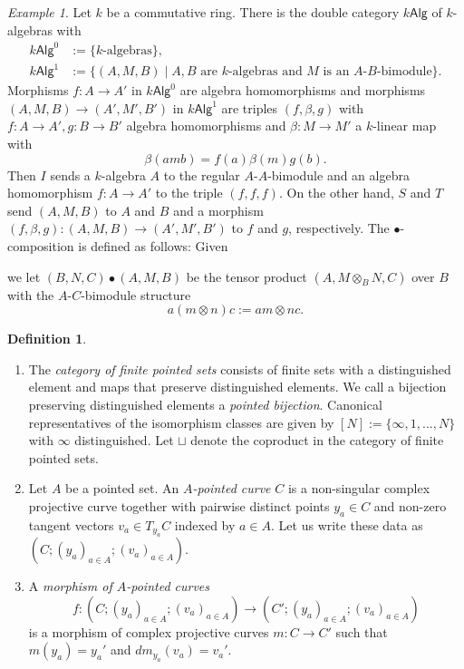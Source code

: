 \documentclass[11pt]{report}
\theoremstyle{definition}
\newtheorem{definition}[theorem]{Definition}
\theoremstyle{remark}
\theoremstyle{remark}
\newtheorem*{example}{Example}
\begin{document}
\begin{example}
Let $k$ be a commutative ring. There is the double category $k\mathsf{Alg}$ of $k$-algebras with
\begin{align*}
k\mathsf{Alg}^0 &:= \{ k\text{-algebras} \}, \\
k\mathsf{Alg}^1 &:= \{ (A,M,B) \mid A,B \text{ are } k\text{-algebras and } M \text{ is an } A\text{-}B\text{-bimodule} \}.
\end{align*}
Morphisms $f: A \to A'$ in $k\mathsf{Alg}^0$ are algebra homomorphisms and morphisms $(A,M,B) \to (A',M',B')$ in $k\mathsf{Alg}^1$ are triples $(f,\beta,g)$ with $f: A \to A', g: B \to B'$ algebra homomorphisms and $\beta: M \to M'$ a $k$-linear map with
\begin{equation*}
\beta(amb) = f(a) \beta(m) g(b).
\end{equation*}
Then $I$ sends a $k$-algebra $A$ to the regular $A$-$A$-bimodule and an algebra homomorphism $f: A \to A'$ to the triple $(f,f,f)$. On the other hand, $S$ and $T$ send $(A,M,B)$ to $A$ and $B$ and a morphism $(f,\beta,g): (A,M,B) \to (A',M',B')$ to $f$ and $g$, respectively. The $\bullet$-composition is defined as follows: Given
\begin{center}
\end{center}
we let $(B,N,C) \bullet (A,M,B)$ be the tensor product $(A,M \otimes_B N,C)$ over $B$ with the $A$-$C$-bimodule structure
\begin{equation*}
a(m \otimes n)c := am \otimes nc.
\end{equation*}
\end{example}

\begin{definition}
\begin{enumerate}[label=(\roman*)]
\item The \emph{category of finite pointed sets} consists of finite sets with a distinguished element and maps that preserve distinguished elements. We call a bijection preserving distinguished elements a \emph{pointed bijection}. Canonical representatives of the isomorphism classes are given by $[N] := \{ \infty,1,...,N \}$ with $\infty$ distinguished. Let $\sqcup$ denote the coproduct in the category of finite pointed sets.
\item Let $A$ be a pointed set. An \emph{$A$-pointed curve} $C$ is a non-singular complex projective curve together with pairwise distinct points $y_a \in C$ and non-zero tangent vectors $v_a \in T_{y_a} C$ indexed by $a \in A$. Let us write these data as $(C;(y_a)_{a \in A};(v_a)_{a \in A})$.
\item A \emph{morphism of $A$-pointed curves}
\begin{equation*}
f: (C;(y_a)_{a \in A};(v_a)_{a \in A}) \to (C';(y_{a})_{a \in A};(v_{a})_{a \in A})
\end{equation*}
is a morphism of complex projective curves $m: C \to C'$ such that $m(y_a) = y_a'$ and $dm_{y_a}(v_a) = v_a'$.
\end{enumerate}
\end{definition}
\end{document}
